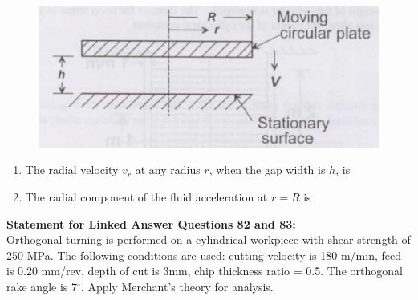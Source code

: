 \documentclass[journal,12pt,onecolumn]{IEEEtran}
\begin{document}
\begin{figure}[H]
    \centering
    \includegraphics[scale=0.3]{q80}
    \caption{}
    \label{q80}
\end{figure}
\begin{enumerate}[resume]
    \item The radial velocity $v_r$ at any radius $r$, when the gap width is $h$, is
          \begin{enumerate}
          \end{enumerate}

    \item The radial component of the fluid acceleration at $r=R$ is
          \begin{enumerate}
          \end{enumerate}
\end{enumerate}
\normalsize\textbf{Statement for Linked Answer Questions 82 and 83:}\\
Orthogonal turning is performed on a cylindrical workpiece with shear strength of 250 MPa. The following conditions are used: cutting velocity is 180 m/min, feed is 0.20 mm/rev, depth of cut is 3mm, chip thickness ratio = 0.5. The orthogonal rake angle is 7$^\circ$. Apply Merchant's theory for analysis.
\end{document}
